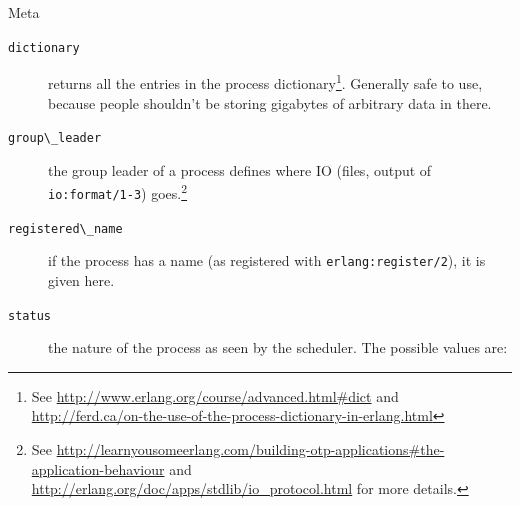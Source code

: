 \documentclass[11pt, oneside]{book}   	%
\newcommand{\function}[1]{\Verb`#1`}
\newcommand{\expression}[1]{\Verb`#1`}
\begin{document}
\begin{description*}
	\item[Meta] \hfill
		\begin{description}		
			\item[\expression{dictionary}] returns all the entries in the process dictionary\footnote{See \href{http://www.erlang.org/course/advanced.html\#dict}{http://www.erlang.org/course/advanced.html\#dict} and \href{http://ferd.ca/on-the-use-of-the-process-dictionary-in-erlang.html}{http://ferd.ca/on-the-use-of-the-process-dictionary-in-erlang.html}}. Generally safe to use, because people shouldn't be storing gigabytes of arbitrary data in there.
			
			\item[\expression{group\_leader}] the group leader of a process defines where IO (files, output of \function{io:format/1-3}) goes.\footnote{See \href{http://learnyousomeerlang.com/building-otp-applications\#the-application-behaviour}{http://learnyousomeerlang.com/building-otp-applications\#the-application-behaviour} and \href{http://erlang.org/doc/apps/stdlib/io\_protocol.html}{http://erlang.org/doc/apps/stdlib/io\_protocol.html} for more details.}
			
			\item[\expression{registered\_name}] if the process has a name (as registered with \function{erlang:register/2}), it is given here.
			
			\item[\expression{status}] the nature of the process as seen by the scheduler. The possible values are:
			

\end{description}
\end{description*}
\end{document}
